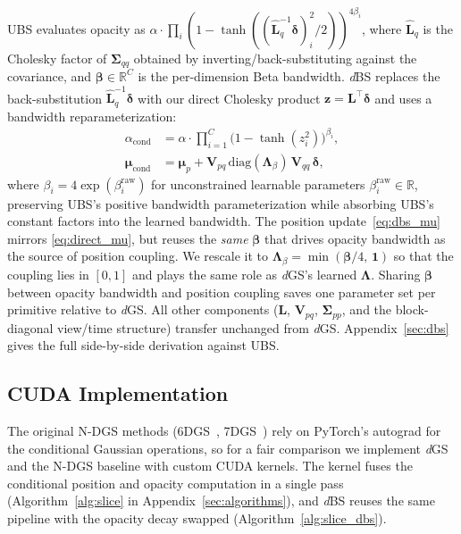\documentclass{article}
\newcommand{\dgs}{\textit{d}GS\xspace}
\newcommand{\dbs}{\textit{d}BS\xspace}
\theoremstyle{plain}
\theoremstyle{definition}
\theoremstyle{remark}
\begin{document}
UBS evaluates opacity as $\alpha\cdot\prod_i (1-\tanh((\hat{\mathbf{L}}_q^{-1}\boldsymbol{\delta})_i^2/2))^{4\beta_i}$, where $\hat{\mathbf{L}}_q$ is the Cholesky factor of $\boldsymbol{\Sigma}_{qq}$ obtained by inverting/back-substituting against the covariance, and $\boldsymbol{\beta}\in\mathbb{R}^C$ is the per-dimension Beta bandwidth. \dbs{} replaces the back-substitution $\hat{\mathbf{L}}_q^{-1}\boldsymbol{\delta}$ with our direct Cholesky product $\mathbf{z}=\mathbf{L}^\top\boldsymbol{\delta}$ and uses a bandwidth reparameterization:
\begin{align}
\alpha_{\text{cond}} &= \alpha \cdot \prod_{i=1}^{C} \bigl(1-\tanh(z_i^2)\bigr)^{\beta_i}, \label{eq:dbs_alpha}\\
\boldsymbol{\mu}_{\text{cond}} &= \boldsymbol{\mu}_p + \mathbf{V}_{pq}\,\mathrm{diag}(\boldsymbol{\Lambda}_\beta)\,\mathbf{V}_{qq}\,\boldsymbol{\delta}, \label{eq:dbs_mu}
\end{align}
where $\beta_i = 4\exp(\beta_i^{\text{raw}})$ for unconstrained learnable parameters $\beta_i^{\text{raw}}\in\mathbb{R}$, preserving UBS's positive bandwidth parameterization while absorbing UBS's constant factors into the learned bandwidth. The position update~\eqref{eq:dbs_mu} mirrors \cref{eq:direct_mu}, but reuses the \emph{same} $\boldsymbol{\beta}$ that drives opacity bandwidth as the source of position coupling. We rescale it to $\boldsymbol{\Lambda}_\beta = \min(\boldsymbol{\beta}/4,\,\mathbf{1})$ so that the coupling lies in $[0,1]$ and plays the same role as \dgs{}'s learned $\boldsymbol{\Lambda}$. Sharing $\boldsymbol{\beta}$ between opacity bandwidth and position coupling saves one parameter set per primitive relative to \dgs{}. All other components ($\mathbf{L}$, $\mathbf{V}_{pq}$, $\boldsymbol{\Sigma}_{pp}$, and the block-diagonal view/time structure) transfer unchanged from \dgs{}. Appendix~\ref{sec:dbs} gives the full side-by-side derivation against UBS.

\subsection{CUDA Implementation}

The original N-DGS methods (6DGS~\citep{gao20246dgs}, 7DGS~\citep{gao20257dgs}) rely on PyTorch's autograd for the conditional Gaussian operations, so for a fair comparison we implement \dgs{} and the N-DGS baseline with custom CUDA kernels. The kernel fuses the conditional position and opacity computation in a single pass (Algorithm~\ref{alg:slice} in Appendix~\ref{sec:algorithms}), and \dbs{} reuses the same pipeline with the opacity decay swapped (Algorithm~\ref{alg:slice_dbs}).
\end{document}
